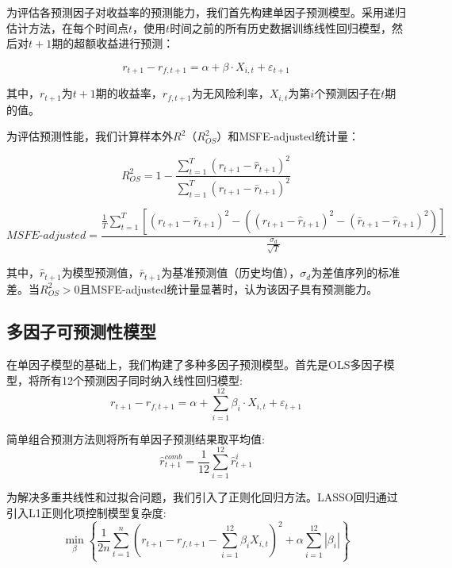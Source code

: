 \documentclass[12pt, a4paper]{article}
\begin{document}
为评估各预测因子对收益率的预测能力，我们首先构建单因子预测模型。采用递归估计方法，在每个时间点$t$，使用$t$时间之前的所有历史数据训练线性回归模型，然后对$t+1$期的超额收益进行预测：

\begin{equation}
r_{t+1} - r_{f,t+1} = \alpha + \beta \cdot X_{i,t} + \varepsilon_{t+1}
\end{equation}

其中，$r_{t+1}$为$t+1$期的收益率，$r_{f,t+1}$为无风险利率，$X_{i,t}$为第$i$个预测因子在$t$期的值。

为评估预测性能，我们计算样本外$R^2$（$R^2_{OS}$）和MSFE-adjusted统计量：

\begin{equation}
R^2_{OS} = 1 - \frac{\sum_{t=1}^{T}(r_{t+1} - \hat{r}_{t+1})^2}{\sum_{t=1}^{T}(r_{t+1} - \bar{r}_{t+1})^2}
\end{equation}

\begin{equation}
MSFE\text{-}adjusted = \frac{\frac{1}{T}\sum_{t=1}^{T}[(r_{t+1} - \bar{r}_{t+1})^2 - ((r_{t+1} - \hat{r}_{t+1})^2 - (\bar{r}_{t+1} - \hat{r}_{t+1})^2)]}{\frac{\sigma_d}{\sqrt{T}}}
\end{equation}

其中，$\hat{r}_{t+1}$为模型预测值，$\bar{r}_{t+1}$为基准预测值（历史均值），$\sigma_d$为差值序列的标准差。当$R^2_{OS} > 0$且MSFE-adjusted统计量显著时，认为该因子具有预测能力。

\subsection{多因子可预测性模型}

在单因子模型的基础上，我们构建了多种多因子预测模型。首先是OLS多因子模型，将所有12个预测因子同时纳入线性回归模型:
\begin{equation}
r_{t+1} - r_{f,t+1} = \alpha + \sum_{i=1}^{12} \beta_i \cdot X_{i,t} + \varepsilon_{t+1}
\end{equation}

简单组合预测方法则将所有单因子预测结果取平均值:
\begin{equation}
\hat{r}_{t+1}^{comb} = \frac{1}{12}\sum_{i=1}^{12}\hat{r}_{t+1}^{i}
\end{equation}

为解决多重共线性和过拟合问题，我们引入了正则化回归方法。LASSO回归通过引入L1正则化项控制模型复杂度:
\begin{equation}
\min_{\beta} \left\{ \frac{1}{2n}\sum_{t=1}^{n}(r_{t+1} - r_{f,t+1} - \sum_{i=1}^{12}\beta_i X_{i,t})^2 + \alpha\sum_{i=1}^{12}|\beta_i| \right\}
\end{equation}
\end{document}

